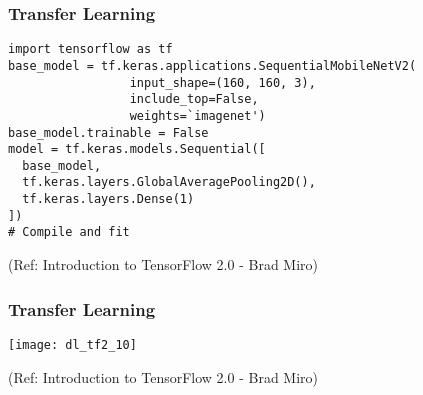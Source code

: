 \begin{frame}[fragile] \frametitle{Transfer Learning}

\begin{lstlisting}
import tensorflow as tf 
base_model = tf.keras.applications.SequentialMobileNetV2(
                 input_shape=(160, 160, 3),
                 include_top=False,
                 weights=`imagenet')
base_model.trainable = False
model = tf.keras.models.Sequential([
  base_model,
  tf.keras.layers.GlobalAveragePooling2D(),
  tf.keras.layers.Dense(1)
])
# Compile and fit
\end{lstlisting}


\tiny{(Ref: Introduction to TensorFlow 2.0 - Brad Miro)}
\end{frame}
\begin{frame}[fragile] \frametitle{Transfer Learning}

\begin{center}
\texttt{[image: dl\_tf2\_10]}
\end{center}




\tiny{(Ref: Introduction to TensorFlow 2.0 - Brad Miro)}
\end{frame}